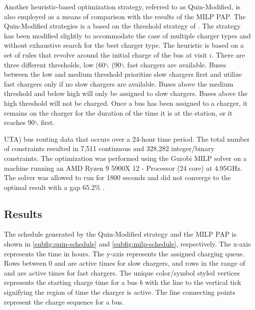 \documentclass[utf8]{FrontiersinHarvard}
\let\cite\citep                                       %
\newcommand{\fast}{15 }                                                         %
\newcommand{\slow}{15 }                                                         %
\newcommand{\contvars}{7,511 }
\newcommand{\intvars}{328,282 }
\newcommand{\timeran}{1800 }                                                    %
\newcommand{\gappercent}{65.2\% }                                               %
\begin{document}
Another heuristic-based optimization strategy, referred to as Quin-Modified, is also employed as a means of comparison
with the results of the MILP PAP. The Quin-Modified strategies is a based on the threshold strategy of
\cite{qin-2016-numer-analy}. The strategy has been modified slightly to accommodate the case of multiple charger types
and without exhaustive search for the best charger type. The heuristic is based on a set of rules that revolve around
the initial charge of the bus at visit \(i\). There are three different thresholds, low (60$\backslash$%
(90$\backslash$%
fast chargers are available. Buses between the low and medium threshold prioritize slow chargers first and utilize fast
chargers only if no slow chargers are available. Buses above the medium threshold and below high will only be assigned
to slow chargers. Buses above the high threshold will not be charged. Once a bus has been assigned to a charger, it
remains on the charger for the duration of the time it is at the station, or it reaches 90$\backslash$%
first.

UTA) bus routing data that occurs over a 24-hour time period. The total number of constraints resulted in \contvars
continuous and \intvars integer/binary constraints. The optimization was performed using the Gurobi MILP solver
\cite{gurobi-2021-gurob-optim} on a machine running an AMD Ryzen 9 5900X 12 - Processor (24 core) at 4.95GHz. The solver
was allowed to run for \timeran seconds and did not converge to the optimal result with a gap \gappercent.

\subsection{Results}
\label{results}
The schedule generated by the Quin-Modified strategy and the MILP PAP is shown in \autoref{subfig:quin-schedule} and
\autoref{subfig:milp-schedule}, respectively. The x-axis represents the time in hours. The y-axis represents the
assigned charging queue. Rows between 0 and \fpeval{\slow - 1} are active times for slow chargers, and rows in the range
of \fpeval{\slow - 1} and \fpeval{\fast + \slow - 1} are active times for fast chargers. The unique color/symbol styled
vertices represents the starting charge time for a bus \(b\) with the line to the vertical tick signifying the region of
time the charger is active. The line connecting points represent the charge sequence for a bus.
\end{document}
